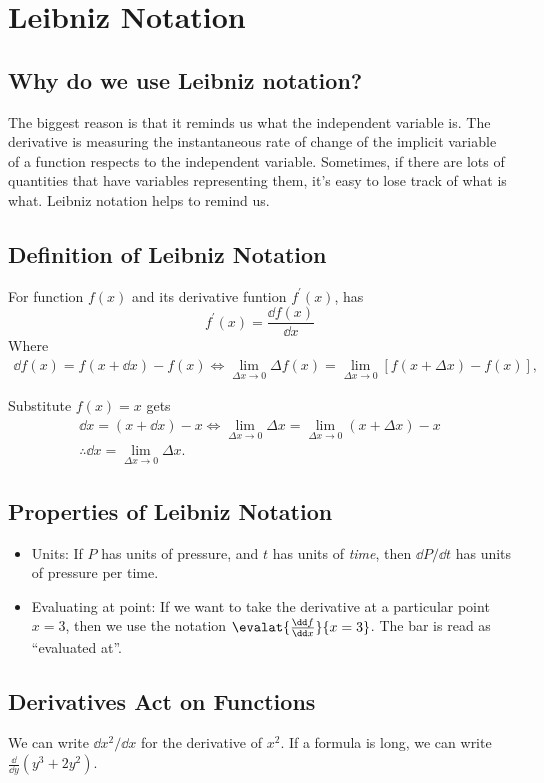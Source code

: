 \section{Leibniz Notation}
\subsection{Why do we use Leibniz notation?}
The biggest reason is that it reminds us what the independent variable is. The derivative is measuring the instantaneous rate of change of the implicit variable of a function respects to the independent variable. Sometimes, if there are lots of quantities that have variables representing them, it's easy to lose track of what is what. Leibniz notation helps to remind us.

\subsection{Definition of Leibniz Notation}
For function $f(x)$ and its derivative funtion $f^\prime(x)$, has
\[f^\prime(x)=\frac{\dd f(x)}{\dd x}\]
Where
\begin{gather*}
\dd f(x)=f(x+\dd x)-f(x)\iff\lim_{\Delta x\to0}\Delta f(x)=\lim_{\Delta x\to0}[f(x+\Delta x)-f(x)],
\end{gather*}
\begin{corollary}[$\dd x=\svlim_{\Delta x\to0}\Delta x$]
  Substitute $f(x)=x$ gets
  \begin{gather*}
    \dd x=(x+\dd x)-x\iff\lim_{\Delta x\to0}\Delta x=\lim_{\Delta x\to0}(x+\Delta x)-x\\
    \therefore\dd x=\lim_{\Delta x\to0}\Delta x.
  \end{gather*}
\end{corollary}
\subsection{Properties of Leibniz Notation}
\begin{itemize}
\item Units: If $P$ has units of pressure, and $t$ has units of \textit{time}, then $\dd P/\dd t$ has units of pressure per time.
\item Evaluating at point: If we want to take the derivative at a particular point $x=3$, then we use the notation $\evalat{\frac{\dd f}{\dd x}}{x=3}$. The bar is read as ``evaluated at''.
\end{itemize}

\subsection{Derivatives Act on Functions}
We can write $\dd x^2/\dd x$ for the derivative of $x^2$. If a formula is long, we can write $\frac\dd{\dd y}(y^3+2y^2)$.


